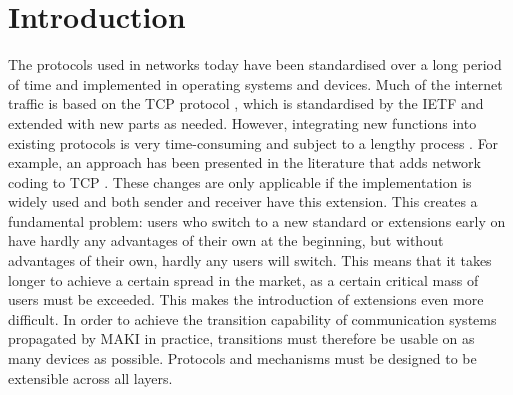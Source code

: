 \section{Introduction}

The protocols used in networks today have been standardised over a long period of time and implemented in operating systems and devices.
Much of the internet traffic is based on the TCP protocol \cite{A3:john2007analysis}, which is standardised by the IETF and extended with new parts as needed. 
However, integrating new functions into existing protocols is very time-consuming and subject to a lengthy process \cite{A3:de2019pluginizing}. 
For example, an approach has been presented in the literature that adds network coding to TCP \cite{A3:sundararajan2011network}. 
These changes are only applicable if the implementation is widely used and both sender and receiver have this extension. 
This creates a fundamental problem: users who switch to a new standard or extensions early on have hardly any advantages of their own at the beginning, but without advantages of their own, hardly any users will switch.
This means that it takes longer to achieve a certain spread in the market, as a certain critical mass of users must be exceeded. 
This makes the introduction of extensions even more difficult.
In order to achieve the transition capability of communication systems propagated by MAKI in practice, transitions must therefore be usable on as many devices as possible. Protocols and mechanisms must be designed to be extensible across all layers. 
